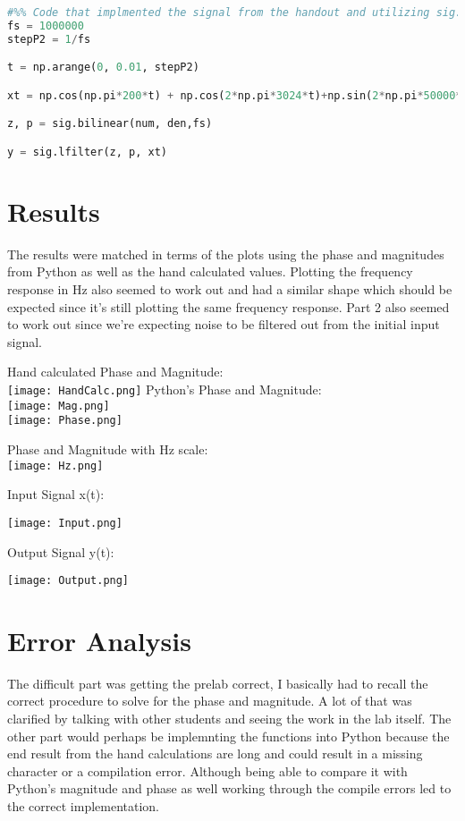 \documentclass[12pt]{report}
\begin{document}
\begin{lstlisting}[language=Python]
#%% Code that implmented the signal from the handout and utilizing sig.bilinear and sig.lfilter to pass the singal through an RLC circuit and the filter. 
fs = 1000000
stepP2 = 1/fs

t = np.arange(0, 0.01, stepP2)

xt = np.cos(np.pi*200*t) + np.cos(2*np.pi*3024*t)+np.sin(2*np.pi*50000*t)

z, p = sig.bilinear(num, den,fs)

y = sig.lfilter(z, p, xt)


\end{lstlisting}
\section{Results}

The results were matched in terms of the plots using the phase and magnitudes from Python as well as the hand calculated values. Plotting the frequency response in Hz also seemed to work out and had a similar shape which should be expected since it's still plotting the same frequency response. Part 2 also seemed to work out since we're expecting noise to be filtered out from the initial input signal. 


Hand calculated Phase and Magnitude:
\\ \texttt{[image: HandCalc.png]}
\newpage
Python's Phase and Magnitude:
\\ \texttt{[image: Mag.png]}
\\ \texttt{[image: Phase.png]}

Phase and Magnitude with Hz scale:
\\ \texttt{[image: Hz.png]}

\newpage

Input Signal x(t):

 \texttt{[image: Input.png]}

Output Signal y(t):

 \texttt{[image: Output.png]}




\section{Error Analysis}

The difficult part was getting the prelab correct, I basically had to recall the correct procedure to solve for the phase and magnitude. A lot of that was clarified by talking with other students and seeing the work in the lab itself. The other part would perhaps be implemnting the functions into Python because the end result from the hand calculations are long and could result in a missing character or a compilation error. Although being able to compare it with Python's magnitude and phase as well working through the compile errors led to the correct implementation. 
\end{document}
